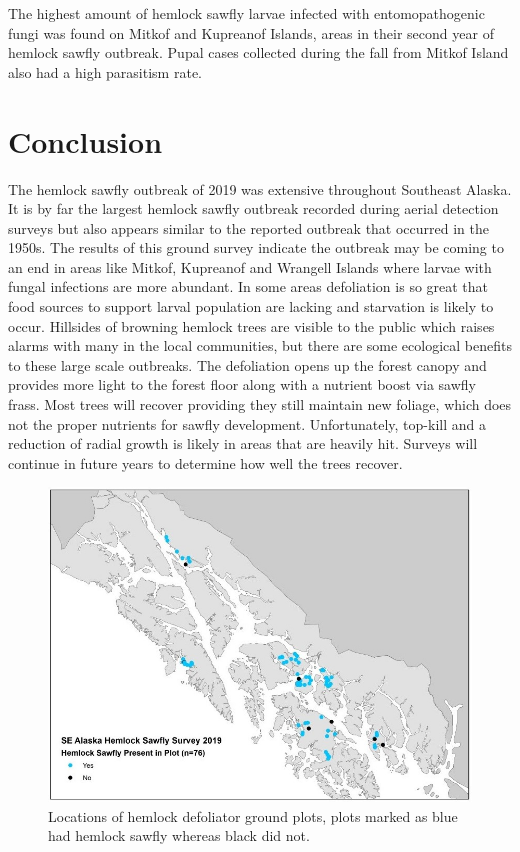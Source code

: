 \begin{multicols}{2}
The highest amount of hemlock sawfly larvae infected with entomopathogenic fungi was found on Mitkof and Kupreanof Islands, areas in their second year of hemlock sawfly outbreak.  Pupal cases collected during the fall from Mitkof Island also had a high parasitism rate.

\section{Conclusion}

The hemlock sawfly outbreak of 2019 was extensive throughout Southeast Alaska.  It is by far the largest hemlock sawfly outbreak recorded during aerial detection surveys but also appears similar to the reported outbreak that occurred in the 1950s.  The results of this ground survey indicate the outbreak may be coming to an end in areas like Mitkof, Kupreanof and Wrangell Islands where larvae with fungal infections are more abundant.  In some areas defoliation is so great that food sources to support larval population are lacking and starvation is likely to occur.  Hillsides of browning hemlock trees are visible to the public which raises alarms with many in the local communities, but there are some ecological benefits to these large scale outbreaks.  The defoliation opens up the forest canopy and provides more light to the forest floor along with a nutrient boost via sawfly frass.  Most trees will recover providing they still maintain new foliage, which does not the proper nutrients for sawfly development.  Unfortunately, top-kill and a reduction of radial growth is likely in areas that are heavily hit.  Surveys will continue in future years to determine how well the trees recover. 

\end{multicols}
\begin{figure}[H]
\begin{center}
\includegraphics[width=16cm]{img/hemlock_sawfly_plot_map.jpg}
\caption{Locations of hemlock defoliator ground plots, plots marked as blue had hemlock sawfly whereas black did not.}
\label{hemlock_sawfly_plot_map}
\end{center}
\end{figure} 
